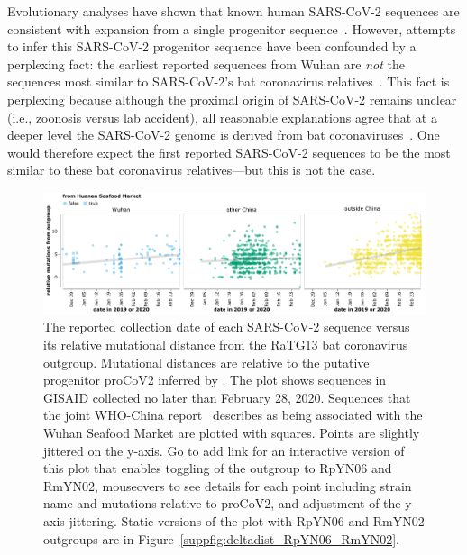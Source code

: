 \documentclass[9pt,twocolumn,twoside]{gsajnl_modified}
\begin{document}
Evolutionary analyses have shown that known human SARS-CoV-2 sequences are consistent with expansion from a single progenitor sequence~\citep{kumar2021evolutionary,pekar2021timing,rambaut2020dynamic,forster2020phylogenetic,pipes2021assessing}.
However, attempts to infer this SARS-CoV-2 progenitor sequence have been confounded by a perplexing fact: the earliest reported sequences from Wuhan are \emph{not} the sequences most similar to SARS-CoV-2's bat coronavirus relatives~\citep{pipes2021assessing}.
This fact is perplexing because although the proximal origin of SARS-CoV-2 remains unclear (i.e., zoonosis versus lab accident), all reasonable explanations agree that at a deeper level the SARS-CoV-2 genome is derived from bat coronaviruses~\citep{lytras2021exploring}.
One would therefore expect the first reported SARS-CoV-2 sequences to be the most similar to these bat coronavirus relatives---but this is not the case.

\begin{figure}
\centering
\includegraphics[width=\linewidth]{figures/deltadist_RaTG13.pdf}
\caption{The reported collection date of each SARS-CoV-2 sequence versus its relative mutational distance from the RaTG13 bat coronavirus outgroup.
Mutational distances are relative to the putative progenitor proCoV2 inferred by \citet{kumar2021evolutionary}.
The plot shows sequences in GISAID collected no later than February 28, 2020.
Sequences that the joint WHO-China report~\citep{WHO2021origins} describes as being associated with the Wuhan Seafood Market are plotted with squares.
Points are slightly jittered on the y-axis.
Go to {\color{red} add link} for an interactive version of this plot that enables toggling of the outgroup to RpYN06 and RmYN02, mouseovers to see details for each point including strain name and mutations relative to proCoV2, and adjustment of the y-axis jittering.
Static versions of the plot with RpYN06 and RmYN02 outgroups are in Figure~\ref{suppfig:deltadist_RpYN06_RmYN02}.
}
\label{fig:deltadist_RaTG13}
\end{figure}
\end{document}
